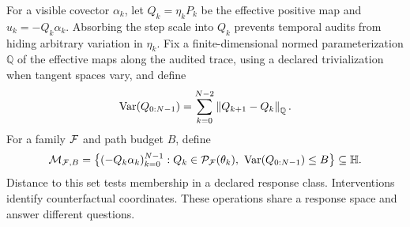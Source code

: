 For a visible covector $\alpha_k$, let $Q_k=\eta_kP_k$ be the effective positive map and $u_k=-Q_k\alpha_k$.  Absorbing the step scale into $Q_k$ prevents temporal audits from hiding arbitrary variation in $\eta_k$.  Fix a finite-dimensional normed parameterization $\mathbb Q$ of the effective maps along the audited trace, using a declared trivialization when tangent spaces vary, and define
\[
\operatorname{Var}(Q_{0:N-1})
=\sum_{k=0}^{N-2}\left\lVert Q_{k+1}-Q_k\right\rVert_{\mathbb Q}.
\]
For a family $\mathcal F$ and path budget $B$, define
\begin{equation}
\mathcal M_{\mathcal F,B}
=\left\{(-Q_k\alpha_k)_{k=0}^{N-1}:
Q_k\in\mathcal P_{\mathcal F}(\theta_k),\
\operatorname{Var}(Q_{0:N-1})\le B\right\}\subseteq\mathbb H.
\label{eq:restricted-response-class}
\end{equation}
Distance to this set tests membership in a declared response class.  Interventions identify counterfactual coordinates.  These operations share a response space and answer different questions.
